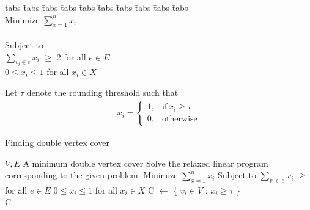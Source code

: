 \begin{tabbing}
  \label{relaxed_lp}
	tabs \= tabs \= tabs \= tabs \= tabs \= tabs \= tabs \= tabs \= tabs \= tabs \kill \\ 
	\> \> Minimize \>\>\>\>\>$\sum\limits_{x=1}^n x_i$  \\ \\
	\> \> Subject to \\
	\> \> \> \> $\sum\limits_{v_{i} \in e} x_i$ $\geq$ 2 \> \> \> for all $e \in E$ \\
	\> \> \> \> $ 0 \leq x_i \leq 1 $ \> \> \> for all $x_i \in X$ \\
\end{tabbing}

Let $\tau$ denote the rounding threshold such that
\begin{align*}
    x_i = \begin{cases}
        1, & \text{if} \, x_i \geq \tau \\
        0, & \text{otherwise}
    \end{cases}
\end{align*}

\begin{algorithm}
  \caption{Finding double vertex cover}
  \label{alg:double_vertex_cover}
  \begin{algorithmic}
    \renewcommand{\algorithmicrequire}{\textbf{Input:}}
    \renewcommand{\algorithmicensure}{\textbf{Output:}}
    \algnewcommand{}
    \algnewcommand\Operation{\item[\algorithmicoperation]}
    \Require $V,E$
    \Ensure A minimum double vertex cover
    \Operation
    \State Solve the relaxed linear program corresponding to the given problem.
    \State \hspace{\algorithmicindent}  Minimize \hspace{\algorithmicindent} $\sum\limits_{x=1}^n x_i$
    \State \hspace{\algorithmicindent}  Subject to
    \State \hspace{\algorithmicindent}  \hspace{\algorithmicindent} $\sum\limits_{v_{i} \in e} x_i$ $\geq$ for all $e \in E$
    \State \hspace{\algorithmicindent}  \hspace{\algorithmicindent} $ 0 \leq x_i \leq 1 $ for all $x_i \in X$
    \State C $\leftarrow$ \{ $v_i \in V$ : $x_i \geq \tau$ \} \\
    \Return C
  \end{algorithmic}
\end{algorithm}

